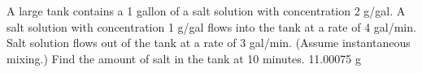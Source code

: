 {
A large tank contains a 1 gallon of a salt solution with concentration 2 g/gal.  A salt solution with concentration 1 g/gal flows into the tank at a rate of 4 gal/min.  Salt solution flows out of the tank at a rate of 3 gal/min.  (Assume instantaneous mixing.) Find the amount of salt in the tank at 10 minutes.
}
{
11.00075 g
}
